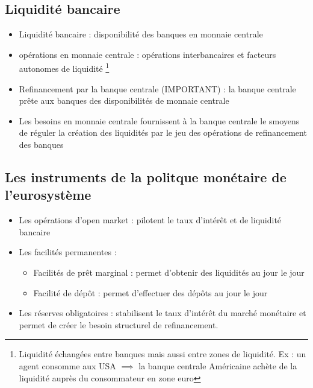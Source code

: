 \subsection{Liquidité bancaire}
\begin{itemize}
    \item \textcolor{BrickRed}{Liquidité bancaire} : disponibilité des banques en monnaie centrale
    \item \textcolor{BrickRed}{opérations en monnaie centrale} : opérations interbancaires et facteurs autonomes de liquidité \footnote{Liquidité échangées entre banques mais aussi entre zones de liquidité. Ex : un agent consomme aux USA $\implies$ la banque centrale Américaine achète de la liquidité auprès du consommateur en zone euro}
    \item \textcolor{BrickRed}{Refinancement par la banque centrale (IMPORTANT)} : la banque centrale prête aux banques des disponibilités de monnaie centrale
    \item \textcolor{BrickRed}{Les besoins en monnaie centrale fournissent à la banque centrale le smoyens de réguler la création des liquidités par le jeu des opérations de refinancement des banques}
\end{itemize}
\subsection{Les instruments de la politque monétaire de l'eurosystème}
\begin{itemize}
    \item \textcolor{BrickRed}{Les opérations d'open market} : pilotent le taux d'intérêt et de liquidité bancaire
    \item \textcolor{BrickRed}{Les facilités permanentes} : 
    \begin{itemize}
        \item \textcolor{BrickRed}{Facilités de prêt marginal} : permet d'obtenir des liquidités au jour le jour
        \item \textcolor{BrickRed}{Facilité de dépôt} : permet d'effectuer des dépôts au jour le jour
    \end{itemize}
    \item \textcolor{BrickRed}{Les réserves obligatoires} : stabilisent le taux d'intérêt du marché monétaire et permet de créer le besoin structurel de refinancement.
\end{itemize}
\newpage
